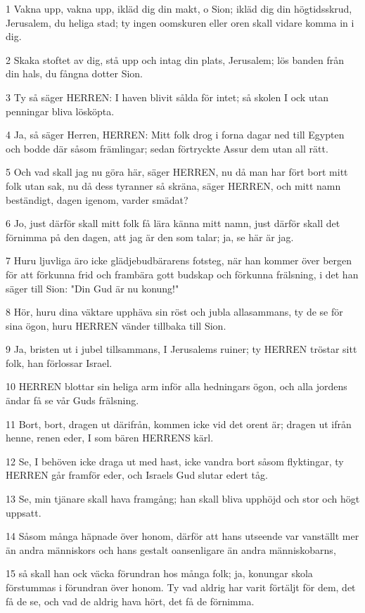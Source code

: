 \par 1 Vakna upp, vakna upp, ikläd dig din makt, o Sion; ikläd dig din högtidsskrud, Jerusalem, du heliga stad; ty ingen oomskuren eller oren skall vidare komma in i dig.
\par 2 Skaka stoftet av dig, stå upp och intag din plats, Jerusalem; lös banden från din hals, du fångna dotter Sion.
\par 3 Ty så säger HERREN: I haven blivit sålda för intet; så skolen I ock utan penningar bliva lösköpta.
\par 4 Ja, så säger Herren, HERREN: Mitt folk drog i forna dagar ned till Egypten och bodde där såsom främlingar; sedan förtryckte Assur dem utan all rätt.
\par 5 Och vad skall jag nu göra här, säger HERREN, nu då man har fört bort mitt folk utan sak, nu då dess tyranner så skräna, säger HERREN, och mitt namn beständigt, dagen igenom, varder smädat?
\par 6 Jo, just därför skall mitt folk få lära känna mitt namn, just därför skall det förnimma på den dagen, att jag är den som talar; ja, se här är jag.
\par 7 Huru ljuvliga äro icke glädjebudbärarens fotsteg, när han kommer över bergen för att förkunna frid och frambära gott budskap och förkunna frälsning, i det han säger till Sion: "Din Gud är nu konung!"
\par 8 Hör, huru dina väktare upphäva sin röst och jubla allasammans, ty de se för sina ögon, huru HERREN vänder tillbaka till Sion.
\par 9 Ja, bristen ut i jubel tillsammans, I Jerusalems ruiner; ty HERREN tröstar sitt folk, han förlossar Israel.
\par 10 HERREN blottar sin heliga arm inför alla hedningars ögon, och alla jordens ändar få se vår Guds frälsning.
\par 11 Bort, bort, dragen ut därifrån, kommen icke vid det orent är; dragen ut ifrån henne, renen eder, I som bären HERRENS kärl.
\par 12 Se, I behöven icke draga ut med hast, icke vandra bort såsom flyktingar, ty HERREN går framför eder, och Israels Gud slutar edert tåg.
\par 13 Se, min tjänare skall hava framgång; han skall bliva upphöjd och stor och högt uppsatt.
\par 14 Såsom många häpnade över honom, därför att hans utseende var vanställt mer än andra människors och hans gestalt oansenligare än andra människobarns,
\par 15 så skall han ock väcka förundran hos många folk; ja, konungar skola förstummas i förundran över honom. Ty vad aldrig har varit förtäljt för dem, det få de se, och vad de aldrig hava hört, det få de förnimma.

